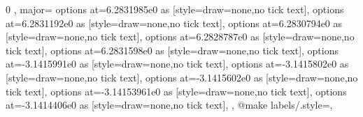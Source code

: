 {{{{{            $0$%
          \else%
            \ifdim\pgfmathresult pt=1.0pt%
              $\pi$%
            \else
              \pgfmathapproxequalto{\tikz@lib@dv@pol}{-1}%
              \ifdim\pgfmathresult pt=1.0pt%
                $-\pi$%
              \else%
                \pgfmathprintnumber{\tikz@lib@dv@pol}$\pi$%
              \fi%
            \fi%
          \fi%
        },
        major={
          options at=6.2831985e0 as [{style={draw=none},no tick text}],
          options at=6.2831192e0 as [{style={draw=none},no tick text}],
          options at=6.2830794e0 as [{style={draw=none},no tick text}],
          options at=6.2828787e0 as [{style={draw=none},no tick text}],
          options at=6.2831598e0 as [{style={draw=none},no tick text}],
          options at=-3.1415991e0 as [{style={draw=none},no tick text}],
          options at=-3.1415802e0 as [{style={draw=none},no tick text}],
          options at=-3.1415602e0 as [{style={draw=none},no tick text}],
          options at=-3.14153961e0 as [{style={draw=none},no tick text}],
          options at=-3.1414406e0 as [{style={draw=none},no tick text}],
        }
      }
    }
  },
  @make labels/.style={},
}%


